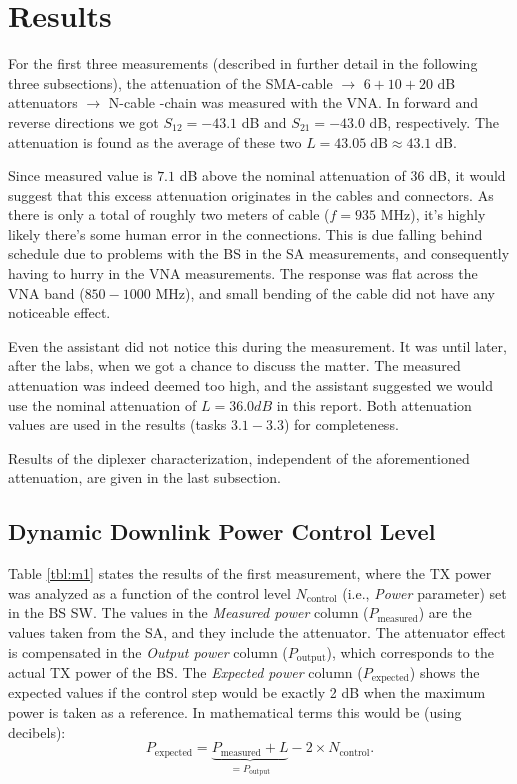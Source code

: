 \documentclass[a4paper, 12pt]{article}
\begin{document}
\newpage
\section{Results}

For the first three measurements (described in further detail in the following three 
subsections), the attenuation of the SMA-cable $\rightarrow$ $6 + 10 + 20$ dB attenuators 
$\rightarrow$ N-cable -chain was measured with the VNA. In forward and reverse directions 
we got $S_{12} = -43.1$ dB and $S_{21} = -43.0$ dB, respectively. The attenuation is 
found as the average of these two $L = 43.05 \mathrm{\;dB} \approx 43.1 \mathrm{\;dB}$.

Since measured value is $7.1$ dB above the nominal attenuation of 36 dB, it would suggest 
that this excess attenuation originates in the cables and connectors. As there is only a 
total of roughly two meters of cable ($f = 935$ MHz), it's highly likely there's some 
human error in the connections. This is due falling behind schedule due to problems with 
the BS in the SA measurements, and consequently having to hurry in the VNA measurements. 
The response was flat across the VNA band ($850 - 1000$ MHz), and small bending of the cable 
did not have any noticeable effect. 

Even the assistant did not notice this during the measurement. It was until later, after 
the labs, when we got a chance to discuss the matter. The measured attenuation was indeed 
deemed too high, and the assistant suggested we would use the nominal attenuation of 
$L = 36.0 dB$ in this report. Both attenuation values are used in the results (tasks 
$3.1 - 3.3$) for completeness.

Results of the diplexer characterization, independent of the aforementioned attenuation, 
are given in the last subsection.


\subsection{Dynamic Downlink Power Control Level}

Table \ref{tbl:m1} states the results of the first measurement, where the TX power was 
analyzed as a function of the control level $N_\mathrm{control}$ (i.e., \textit{Power} 
parameter) set in the BS SW. The values in the \textit{Measured power} column 
($P_\mathrm{measured}$) are the values taken from the SA, and they include the attenuator. 
The attenuator effect is compensated in the \textit{Output power} column ($P_\mathrm{output}$), 
which corresponds to the actual TX power of the BS. The \textit{Expected power} column 
($P_\mathrm{expected}$) shows the expected values if the control step would 
be exactly 2 dB when the maximum power is taken as a reference. In mathematical terms 
this would be (using decibels):
\begin{equation}
	P_\mathrm{expected} = \underbrace{P_\mathrm{measured} + L}_{= P_\mathrm{output}} - 2 \times N_\mathrm{control}.
\end{equation}
\end{document}
